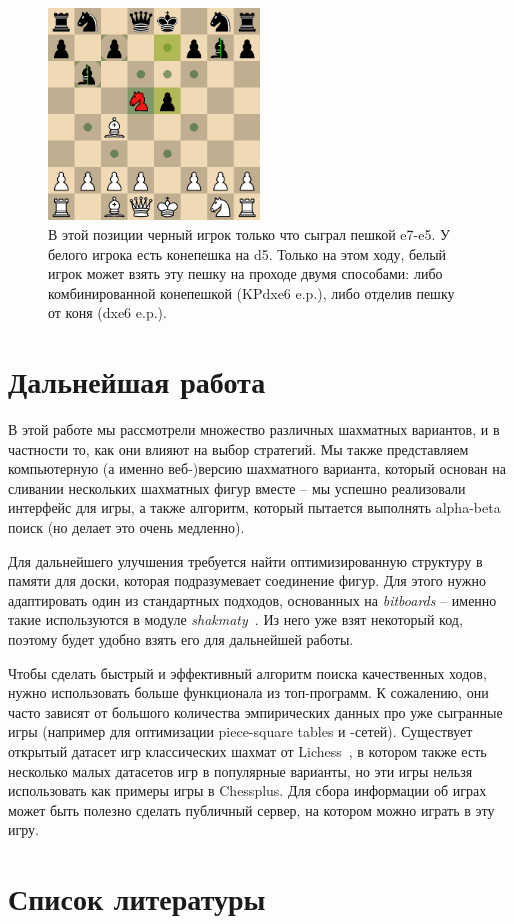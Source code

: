 \documentclass{article}
\begin{document}
\begin{figure}[h]
    \centering
    \includegraphics[width=0.5\textwidth]{img/enpassant-demo.png}
    \caption{
        В этой позиции черный игрок только что сыграл пешкой e7-e5. У белого игрока есть конепешка на d5.
        Только на этом ходу, белый игрок может взять эту пешку на проходе
        двумя способами: либо комбинированной конепешкой (KPdxe6 e.p.),
        либо отделив пешку от коня (dxe6 e.p.).
    }
\end{figure}


\section{Дальнейшая работа}

В этой работе мы рассмотрели множество различных шахматных вариантов,
и в частности то, как они влияют на выбор стратегий.
Мы также представляем компьютерную (а именно веб-)версию шахматного варианта,
который основан на сливании нескольких шахматных фигур вместе --
мы успешно реализовали интерфейс для игры,
а также алгоритм, который пытается выполнять alpha-beta поиск (но делает это очень медленно).

Для дальнейшего улучшения требуется найти оптимизированную структуру в памяти для доски,
которая подразумевает соединение фигур.
Для этого нужно адаптировать один из стандартных подходов, основанных на \emph{bitboards} --
именно такие используются в модуле \emph{shakmaty}~\cite{shakmaty-crate}.
Из него уже взят некоторый код,
поэтому будет удобно взять его для дальнейшей работы.

Чтобы сделать быстрый и эффективный алгоритм поиска качественных ходов,
нужно использовать больше функционала из топ-программ.
К сожалению, они часто зависят от большого количества эмпирических данных
про уже сыгранные игры
(например для оптимизации piece-square tables и -сетей).
Существует открытый датасет игр классических шахмат от Lichess~\cite{lichess-dataset},
в котором также есть несколько малых датасетов игр в популярные варианты,
но эти игры нельзя использовать как примеры игры в Chessplus.
Для сбора информации об играх может быть полезно сделать публичный сервер,
на котором можно играть в эту игру.


\newpage

\section{Список литературы}

\printbibliography
\end{document}
